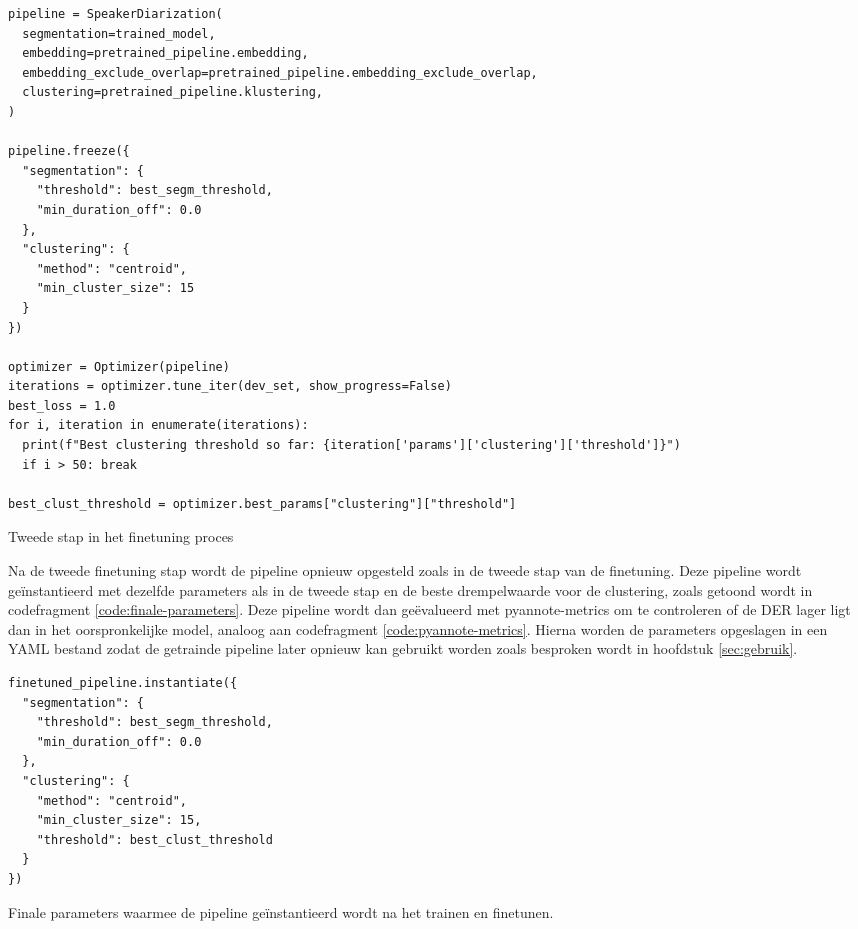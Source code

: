 \begin{listing}
	\begin{verbatim}
pipeline = SpeakerDiarization(
  segmentation=trained_model,
  embedding=pretrained_pipeline.embedding,
  embedding_exclude_overlap=pretrained_pipeline.embedding_exclude_overlap,
  clustering=pretrained_pipeline.klustering,
)

pipeline.freeze({
  "segmentation": {
    "threshold": best_segm_threshold,
    "min_duration_off": 0.0
  },
  "clustering": {
    "method": "centroid",
    "min_cluster_size": 15
  }
})

optimizer = Optimizer(pipeline)
iterations = optimizer.tune_iter(dev_set, show_progress=False)
best_loss = 1.0
for i, iteration in enumerate(iterations):
  print(f"Best clustering threshold so far: {iteration['params']['clustering']['threshold']}")
  if i > 50: break
    
best_clust_threshold = optimizer.best_params["clustering"]["threshold"]
	\end{verbatim}
	\caption[Set-up voor tweede finetuning]{\label{code:tweede-finetuning}Tweede stap in het finetuning proces}
\end{listing}

Na de tweede finetuning stap wordt de pipeline opnieuw opgesteld zoals in de tweede stap van de finetuning. Deze pipeline wordt geïnstantieerd met dezelfde parameters als in de tweede stap en de beste drempelwaarde voor de clustering, zoals getoond wordt in codefragment \ref{code:finale-parameters}. Deze pipeline wordt dan geëvalueerd met pyannote-metrics om te controleren of de DER lager ligt dan in het oorspronkelijke model, analoog aan codefragment \ref{code:pyannote-metrics}. Hierna worden de parameters opgeslagen in een YAML bestand zodat de getrainde pipeline later opnieuw kan gebruikt worden zoals besproken wordt in hoofdstuk \ref{sec:gebruik}.

\begin{listing}
	\begin{verbatim}
finetuned_pipeline.instantiate({
  "segmentation": {
    "threshold": best_segm_threshold,
    "min_duration_off": 0.0
  },
  "clustering": {
    "method": "centroid",
    "min_cluster_size": 15,
    "threshold": best_clust_threshold
  }
})
	\end{verbatim}
	\caption[Finale parameters]{\label{code:finale-parameters}Finale parameters waarmee de pipeline geïnstantieerd wordt na het trainen en finetunen.}
\end{listing}

